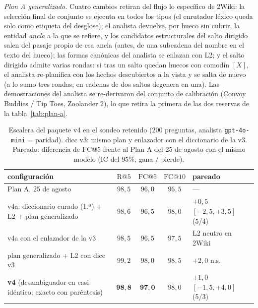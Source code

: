 \documentclass[11pt,a4paper]{article}
\begin{document}
\emph{Plan A generalizado.} Cuatro cambios retiran del flujo lo específico de
2Wiki: la selección final de conjunto se ejecuta en todos los tipos (el
enrutador léxico queda solo como etiqueta del desglose); el analista devuelve,
por hueco sin cubrir, la entidad \emph{ancla} a la que se refiere, y los
candidatos estructurales del salto dirigido salen del pasaje propio de esa
ancla (antes, de una subcadena del nombre en el texto del hueco); las formas
canónicas del analista se enlazan con L2; y el salto dirigido admite varias
rondas: si tras un salto quedan huecos con comodín $[X]$, el analista
re-planifica con los hechos descubiertos a la vista y se salta de nuevo (a lo
sumo tres rondas; en cadenas de dos saltos degenera en una). Las
demostraciones del analista se re-derivaron del conjunto de calibración
(\guillemotleft{}Convoy Buddies / Tip Toes\guillemotright{}, \guillemotleft{}Zoolander 2\guillemotright{}), lo que retira la
primera de las dos reservas de la tabla~\ref{tab:plan-a}.

\begin{table}[t]
\centering\footnotesize\setlength{\tabcolsep}{4pt}
\caption{Escalera del paquete v4 en el sondeo retenido ($200$ preguntas,
analista \texttt{gpt-4o-mini} = paridad). \guillemotleft{}dicc v3\guillemotright{}: mismo plan y enlazador
con el diccionario de la v3. Pareado: diferencia de $\mathrm{FC@}5$ frente al
Plan A del 25 de agosto con el mismo modelo (IC del $95\%$; gana / pierde).}
\label{tab:v4-sondeo}
\begin{tabular}{lcccl}
\toprule
configuración & $\mathrm{R@}5$ & $\mathrm{FC@}5$ & $\mathrm{FC@}10$ & pareado\\
\midrule
Plan A, 25 de agosto & $98{,}5$ & $96{,}0$ & $96{,}5$ & ---\\
v4a: diccionario curado (1.ª) $+$ L2 $+$ plan generalizado & $98{,}6$ & $96{,}5$ & $98{,}0$ & $+0{,}5$ $[-2{,}5,+3{,}5]$ (5/4)\\
\quad v4a con el enlazador de la v3 & $98{,}5$ & $96{,}5$ & $97{,}5$ & L2 neutro en 2Wiki\\
\quad plan generalizado $+$ L2 con dicc v3 & $99{,}2$ & $98{,}0$ & $98{,}5$ & $+2{,}0$ n.s.\\
\textbf{v4} (desambiguador en \guillemotleft{}casi idéntico\guillemotright{}; exacto con paréntesis) & $\mathbf{98{,}8}$ & $\mathbf{97{,}0}$ & $98{,}0$ & $+1{,}0$ $[-1{,}5,+4{,}0]$ (5/3)\\
\bottomrule
\end{tabular}
\end{table}
\end{document}
